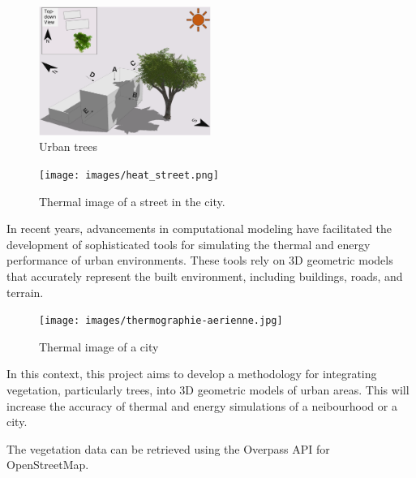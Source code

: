 \documentclass[12pt]{article}
\begin{document}
\begin{figure}[H]
    \centering
    \includegraphics[width=0.5\textwidth]{images/TreeShade.png}
    \caption{Urban trees \cite{img:TreeShade}}
\end{figure}

\begin{figure}[H]
    \centering
    \texttt{[image: images/heat\_street.png]}
    \caption{Thermal image of a street in the city. \cite{img:street_thermography}}
\end{figure}

In recent years, advancements in computational modeling have facilitated the 
development of sophisticated tools for simulating the thermal and energy performance 
of urban environments. These tools rely on 3D geometric models that accurately 
represent the built environment, including buildings, roads, and terrain.

\begin{figure}[H]
    \centering
    \texttt{[image: images/thermographie-aerienne.jpg]}
    \caption{Thermal image of a city \cite{img:aerialview}}
\end{figure}

In this context, this project aims to develop a methodology for integrating 
vegetation, particularly trees, into 3D geometric models of urban areas. This
will increase the accuracy of thermal and energy simulations of a neibourhood
or a city.

The vegetation data can be retrieved using the Overpass API for OpenStreetMap.
\vspace{0.5cm}
\end{document}
